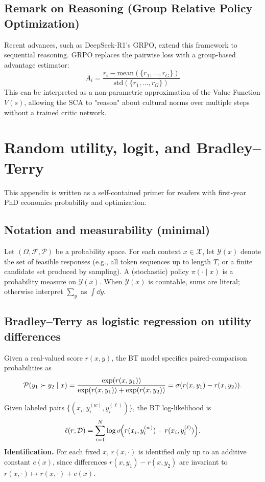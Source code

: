 \subsection{Remark on Reasoning (Group Relative Policy Optimization)}
Recent advances, such as DeepSeek-R1's GRPO, extend this framework to sequential reasoning. GRPO replaces the pairwise loss with a group-based advantage estimator:
$$ A_i = \frac{r_i - \text{mean}(\{r_1, \dots, r_G\})}{\text{std}(\{r_1, \dots, r_G\})} $$
This can be interpreted as a non-parametric approximation of the Value Function $V(s)$, allowing the SCA to "reason" about cultural norms over multiple steps without a trained critic network.

\section{Random utility, logit, and Bradley--Terry}\label{app:rum}

This appendix is written as a self-contained primer for readers with first-year PhD economics probability and optimization.

\subsection{Notation and measurability (minimal)}
Let $(\Omega,\mathcal{F},\mathcal{P})$ be a probability space. For each context $x\in\mathcal{X}$, let $\mathcal{Y}(x)$ denote the set of feasible responses
(e.g., all token sequences up to length $T$, or a finite candidate set produced by sampling).
A (stochastic) policy $\pi(\cdot\mid x)$ is a probability measure on $\mathcal{Y}(x)$.
When $\mathcal{Y}(x)$ is countable, sums are literal; otherwise interpret $\sum_y$ as $\int \dd y$.

\subsection{Bradley--Terry as logistic regression on utility differences}
\begin{definition}
Given a real-valued score $r(x,y)$, the BT model specifies paired-comparison probabilities as
\[
\mathcal{P}(y_1 \succ y_2 \mid x)
=
\frac{\exp(r(x,y_1))}{\exp(r(x,y_1))+\exp(r(x,y_2))}
=
\sigma(r(x,y_1)-r(x,y_2)).
\]
\end{definition}

Given labeled pairs $\{(x_i,y_i^{(w)},y_i^{(\ell)})\}$, the BT log-likelihood is
\begin{equation}\label{eq:bt-ll}
\ell(r;\mathcal{D})
=
\sum_{i=1}^N \log \sigma\!\Big(r(x_i,y_i^{(w)})-r(x_i,y_i^{(\ell)})\Big).
\end{equation}
\textbf{Identification.} For each fixed $x$, $r(x,\cdot)$ is identified only up to an additive constant $c(x)$,
since differences $r(x,y_1)-r(x,y_2)$ are invariant to $r(x,\cdot)\mapsto r(x,\cdot)+c(x)$.

